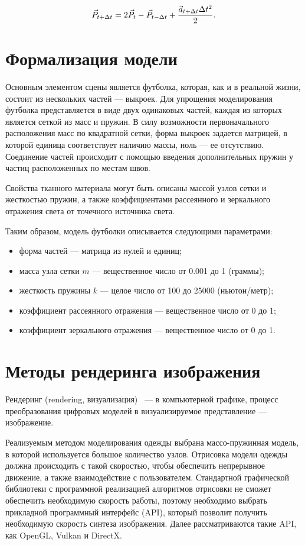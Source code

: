 \begin{equation}\label{eq:13}
    \vec{P}_{t+\Delta t} = 2\vec{P}_{t} - \vec{P}_{t-\Delta t} +
    \frac{\vec{a}_{t+\Delta t}\Delta{t}^2}{2}. \\
\end{equation}

\section{Формализация модели}

Основным элементом сцены является футболка, которая, как и в реальной
жизни, состоит из нескольких частей --- выкроек. Для упрощения моделирования
футболка представляется в виде двух одинаковых частей, каждая из которых
является сеткой из масс и пружин. В силу возможности первоначального
расположения масс по квадратной сетки, форма выкроек задается матрицей, в
которой единица соответствует наличию массы, ноль --- ее отсутствию. Соединение
частей происходит с помощью введения дополнительных пружин у частиц
расположенных по местам швов.

Свойства тканного материала могут быть описаны массой узлов сетки и жесткостью
пружин, а также коэффициентами рассеянного и зеркального отражения света
от точечного источника света.

Таким образом, модель футболки описывается следующими параметрами:
\begin{itemize}
    \item форма частей --- матрица из нулей и единиц;
    \item масса узла сетки $m$ --- вещественное число от 0.001 до 1 (граммы);
    \item жесткость пружины $k$ --- целое число от 100 до 25000 (ньютон/метр);
    \item коэффициент рассеянного отражения --- вещественное число от 0 до 1;
    \item коэффициент зеркального отражения --- вещественное число от 0 до 1.
\end{itemize}

\section{Методы рендеринга изображения}

Рендеринг (rendering, визуализация)~\cite{bib16} --- в компьютерной графике,
процесс преобразования цифровых моделей в визуализируемое представление ---
изображение.

Реализуемым методом моделирования одежды выбрана массо-пружинная модель, в
которой используется большое количество узлов.
Отрисовка модели одежды должна происходить с такой скоростью, чтобы обеспечить
непрерывное движение, а также взаимодействие с пользователем.
Стандартной графической библиотеки с программной реализацией алгоритмов
отрисовки не сможет обеспечить необходимую скорость работы, поэтому необходимо
выбрать прикладной программный интерфейс (API), который позволит получить
необходимую скорость синтеза изображения. Далее рассматриваются такие API,
как OpenGL, Vulkan и DirectX.


